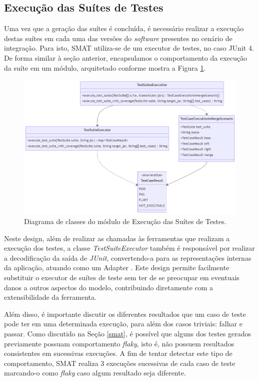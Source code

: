 \documentclass[12pt]{article}
\begin{document}
\subsection{Execução das Suítes de Testes}
Uma vez que a geração das suítes é concluída, é necessário realizar a execução destas suítes em cada uma das versões do \textit{software} presentes no cenário de integração. Para isto, SMAT utiliza-se de um executor de testes, no caso JUnit 4. De forma similar à seção anterior, encapsulamos o comportamento da execução da suíte em um módulo, arquitetado conforme mostra a Figura \ref{fig:tse}.

\begin{figure}
    \centering
    \includegraphics[width=\textwidth]{tse.png}
    \caption{Diagrama de classes do módulo de Execução das Suítes de Testes.}
    \label{fig:tse}
\end{figure}

Neste design, além de realizar as chamadas às ferramentas que realizam a execução dos testes, a classe \textit{TestSuiteExecutor} também é responsável por realizar a decodificação da saída de \textit{JUnit}, convertendo-a para as representações internas da aplicação, atuando como um Adapter \cite{gof}. Este design permite facilmente substituir o executor de suítes de teste sem ter de se preocupar em eventuais danos a outros aspectos do modelo, contribuindo diretamente com a extensibilidade da ferramenta.
	
Além disso, é importante discutir os diferentes resultados que um caso de teste pode ter em uma determinada execução, para além dos casos triviais: falhar e passar. Como discutido na Seção \ref{smat}, é possível que alguns dos testes gerados previamente possuam comportamento \textit{flaky}, isto é, não possuem resultados consistentes em sucessivas execuções. A fim de tentar detectar este tipo de comportamento, SMAT realiza 3 execuções sucessivas de cada caso de teste marcando-o como \textit{flaky} caso algum resultado seja diferente.
\end{document}

